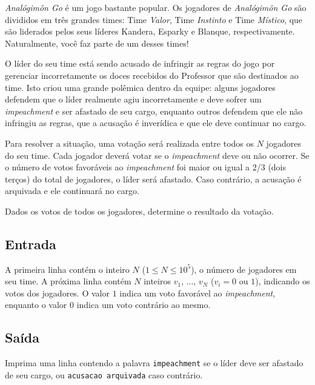 \textit{Analógimôn Go} é um jogo bastante popular.
Os jogadores de \textit{Analógimôn Go} são divididos em três grandes
times: Time \textit{Valor}, Time \textit{Instinto} e Time \textit{Místico}, que
são liderados pelos seus líderes Kandera, Esparky e Blanque, respectivamente.
Naturalmente, você faz parte de um desses times!

O líder do seu time está sendo acusado de infringir as regras do jogo por
gerenciar incorretamente os doces recebidos do Professor que são destinados ao
time. Isto criou uma grande polêmica dentro da equipe: alguns jogadores defendem
que o líder realmente agiu incorretamente e deve sofrer um \textit{impeachment}
e ser afastado de seu cargo, enquanto outros defendem que ele não infringiu as
regras, que a acusação é inverídica e que ele deve continuar no cargo.

Para resolver a situação, uma votação será realizada entre todos os $N$
jogadores do seu time. Cada jogador deverá votar se o \textit{impeachment} deve
ou não ocorrer. Se o número de votos favoráveis ao \textit{impeachment} foi
maior ou igual a 2/3 (dois terços) do total de jogadores, o líder será afastado.
Caso contrário, a acusação é arquivada e ele continuará no cargo.

Dados os votos de todos os jogadores, determine o resultado da votação.

\subsection*{Entrada}

A primeira linha contém o inteiro $N$ ($1 \leq N \leq 10^5$), o número de
jogadores em seu time.
A próxima linha contém $N$ inteiros $v_1$, ..., $v_N$ ($v_i = 0$ ou $1$),
indicando os votos dos jogadores. O valor $1$ indica um voto favorável ao
\textit{impeachment}, enquanto o valor $0$ indica um voto contrário ao mesmo.

\subsection*{Saída}

Imprima uma linha contendo a palavra \verb|impeachment| se o líder deve
ser afastado de seu cargo, ou \verb|acusacao arquivada| caso contrário.

